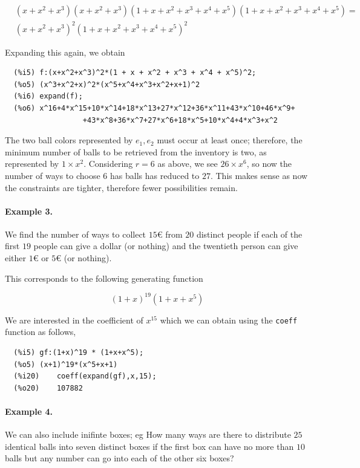 \begin{align*}
  &(x + x^2 + x^3)(x + x^2 + x^3)(1 + x + x^2 + x^3 + x^4 + x^5)(1 + x + x^2 + x^3 + x^4 + x^5) = \\
  &(x + x^2 + x^3)^2(1 + x + x^2 + x^3 + x^4 + x^5)^2
\end{align*}
  
Expanding this again, we obtain

\begin{verbatim}
  (%i5)	f:(x+x^2+x^3)^2*(1 + x + x^2 + x^3 + x^4 + x^5)^2;
  (%o5)	(x^3+x^2+x)^2*(x^5+x^4+x^3+x^2+x+1)^2
  (%i6)	expand(f);
  (%o6)	x^16+4*x^15+10*x^14+18*x^13+27*x^12+36*x^11+43*x^10+46*x^9+
                  +43*x^8+36*x^7+27*x^6+18*x^5+10*x^4+4*x^3+x^2
\end{verbatim}

The two ball colors represented by $e_1, e_2$ must occur at least once; therefore, the minimum number of balls to be retrieved from the inventory is two, as represented by $1 \times x^2$. Considering $r=6$ as above, we see $26 \times x^6$, so now the number of ways to choose $6$ has balls has reduced to $27$. This makes sense as now the constraints are tighter, therefore fewer possibilities remain.

\paragraph{Example 3.}  We find the number of ways to collect $15$€ from $20$ distinct people if each of the first $19$ people can give a dollar (or nothing) and the twentieth person can give either $1$€ or $5$€ (or nothing).

This corresponds to the following generating function

\begin{equation*}
  (1+x)^{19}(1+x+x^5)
\end{equation*}

We are interested in the coefficient of $x^{15}$ which we can obtain using the \verb|coeff| function as follows,

\begin{verbatim}
  (%i5)	gf:(1+x)^19 * (1+x+x^5);
  (%o5)	(x+1)^19*(x^5+x+1)
  (%i20)	coeff(expand(gf),x,15);
  (%o20)	107882
\end{verbatim}

\paragraph{Example 4.} We can also include inifinte boxes; eg How many ways are there to distribute $25$ identical balls into seven distinct boxes if the first box can have no more than $10$ balls but any number can go into each of the other six boxes?

